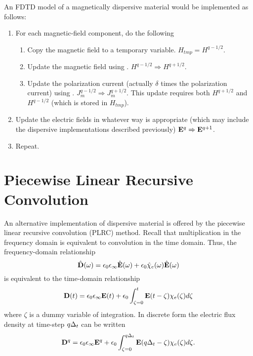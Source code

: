 An FDTD model of a magnetically dispersive material would be
implemented as follows:
\begin{enumerate}
\item For each magnetic-field component, do the following
\begin{enumerate}
\item Copy the magnetic field to a temporary variable.
      $H_{\mathit{tmp}}=H^{q-1/2}$.
\item Update the magnetic field using .
      $H^{q-1/2}\Rightarrow H^{q+1/2}$.
\item Update the polarization current (actually $\delta$ times the
      polarization current) using
      . $J_m^{q-1/2}\Rightarrow J_m^{q+1/2}$.
      This update requires both $H^{q+1/2}$ and $H^{q-1/2}$ (which is stored
      in $H_{\mathit{tmp}}$).
\end{enumerate}
\item Update the electric fields in whatever way is appropriate (which
      may include the dispersive implementations described previously)
      $\mathbf{E}^{q}\Rightarrow \mathbf{E}^{q+1}$.
\item Repeat.
\end{enumerate}

\section{Piecewise Linear Recursive Convolution}

An alternative implementation of dispersive material is offered by the 
piecewise linear recursive convolution (PLRC) method.  Recall that
multiplication in the frequency domain is equivalent to convolution in
the time domain.  Thus, the frequency-domain relationship
\begin{equation}
  \hat{\mathbf{D}}(\omega) = \epsilon_0\epsilon_\infty\hat{\mathbf{E}}(\omega) + 
    \epsilon_0\hat{\chi}_e(\omega)\hat{\mathbf{E}}(\omega)
\end{equation}
is equivalent to the time-domain relationship
\begin{equation}
  \mathbf{D}(t) = \epsilon_0\epsilon_\infty\mathbf{E}(t) + 
    \epsilon_0\int_{\zeta=0}^t\mathbf{E}(t-\zeta)\chi_e(\zeta)d\zeta
\end{equation}
where $\zeta$ is a dummy variable of integration.  In discrete form
the electric flux density at time-step $q\Delta_t$ can be written
\begin{equation}
  \mathbf{D}^q = \epsilon_0\epsilon_\infty\mathbf{E}^q + 
    \epsilon_0\int_{\zeta=0}^{q\Delta_t}\mathbf{E}(q\Delta_t-\zeta)\chi_e(\zeta)d\zeta.
  \label{eq:plrcIntegral}
\end{equation}

